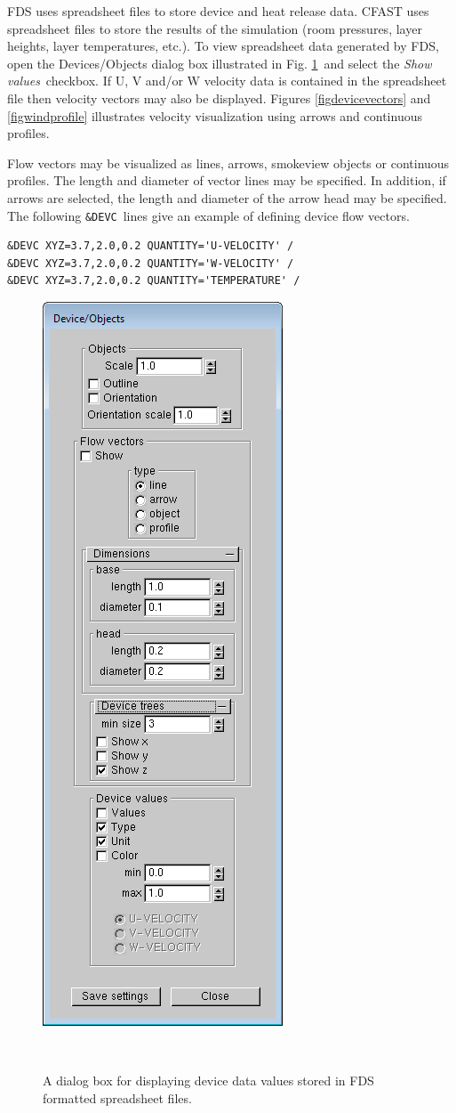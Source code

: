 \documentclass[11pt,twoside]{book}
\begin{document}
FDS uses spreadsheet files to store device and heat release data.
CFAST uses spreadsheet files to store the results of the
simulation (room pressures, layer heights, layer temperatures,
etc.). To view spreadsheet data generated by FDS, open the
Devices/Objects dialog box illustrated in Fig.
\ref{figDEVICES}\ and select the {\em Show values}\ checkbox. If U,
V and/or W velocity data is contained in the spreadsheet file then
velocity vectors may also be displayed. Figures \ref{figdevicevectors} and
\ref{figwindprofile} illustrates velocity visualization using arrows and continuous profiles.


Flow vectors may be visualized as lines, arrows, smokeview objects or continuous profiles.  The length
and diameter of vector lines may be specified.  In addition, if arrows are selected, the length and diameter of the arrow head may be specified.
The following {\tt \&DEVC}\ lines give an example of defining device flow vectors.

\begin{verbatim}
&DEVC XYZ=3.7,2.0,0.2 QUANTITY='U-VELOCITY' /
&DEVC XYZ=3.7,2.0,0.2 QUANTITY='W-VELOCITY' /
&DEVC XYZ=3.7,2.0,0.2 QUANTITY='TEMPERATURE' /
\end{verbatim}


\begin{figure}[bph]
\begin{center}
\includegraphics[width=1.875
in]{FIGURES/figDEVICES}
\end{center}
\caption{A dialog box for displaying device data values stored in
FDS formatted spreadsheet files.}\ \label{figDEVICES}
\end{figure}
\end{document}

